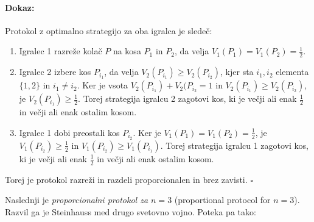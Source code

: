 \documentclass[a4paper, 12pt]{article}
\newenvironment{dokaz}{\paragraph{Dokaz:}}{\hfill$\square$\\}
\begin{document}
	\begin{dokaz}
		Protokol z optimalno strategijo za oba igralca je sledeč:
		\begin{enumerate}
			
			\item Igralec 1 razreže kolač $P$ na kosa $P_1$ in $P_2$, da velja $V_1 (P_1) = V_1 (P_2) = \frac{1}{2}$.
			
			\item Igralec 2 izbere kos $P_{i_1}$, da velja $V_2 (P_{i_1}) \geq V_2 (P_{i_2})$, kjer sta $i_1, i_2$ elementa $\{1, 2\}$ in $i_1 \neq i_2$. Ker je vsota $V_2 (P_{i_1}) + V_2 (P_{i_2} = 1$ in $V_2 (P_{i_1}) \geq V_2 (P_{i_2})$, je $V_2 (P_{i_1}) \geq \frac{1}{2}$. Torej strategija igralcu 2 zagotovi kos, ki je večji ali enak $\frac{1}{2}$ in večji ali enak ostalim kosom.
			
			\item Igralec 1 dobi preostali kos $P_{i_2}$. Ker je $V_1 (P_1) = V_1 (P_2) = \frac{1}{2}$, je $V_1 (P_{i_2}) \geq \frac{1}{2}$ in $V_1 (P_{i_2}) \geq V_1 (P_{i_1})$. Torej strategija igralcu 1 zagotovi kos, ki je večji ali enak $\frac{1}{2}$ in večji ali enak ostalim kosom.
			
		\end{enumerate}
	
		Torej je protokol razreži in razdeli proporcionalen in brez zavisti.
	\end{dokaz}

	Naslednji je \textit{proporcionalni protokol za $n = 3$} (proportional protocol for $n=3$). Razvil ga je Steinhauss med drugo svetovno vojno. Poteka pa tako:
	
\end{document}
